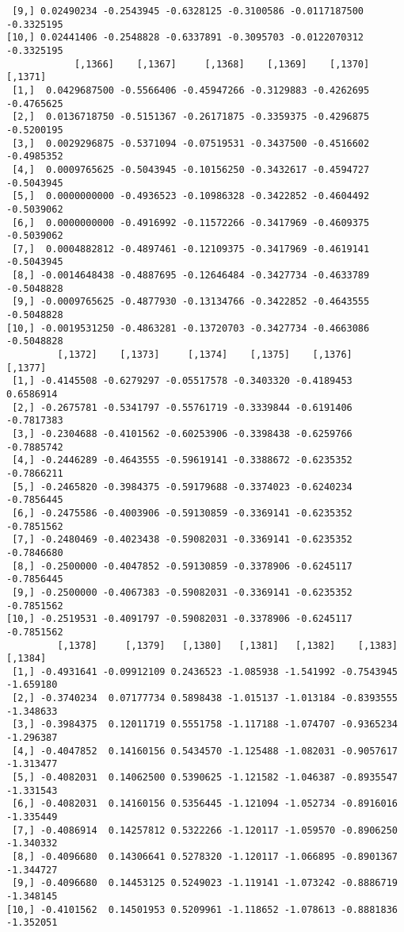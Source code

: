 \documentclass[
  letterpaper,
  DIV=11,
  numbers=noendperiod]{scrreprt}
\begin{document}
\begin{verbatim}
 [9,] 0.02490234 -0.2543945 -0.6328125 -0.3100586 -0.0117187500 -0.3325195
[10,] 0.02441406 -0.2548828 -0.6337891 -0.3095703 -0.0122070312 -0.3325195
            [,1366]    [,1367]     [,1368]    [,1369]    [,1370]    [,1371]
 [1,]  0.0429687500 -0.5566406 -0.45947266 -0.3129883 -0.4262695 -0.4765625
 [2,]  0.0136718750 -0.5151367 -0.26171875 -0.3359375 -0.4296875 -0.5200195
 [3,]  0.0029296875 -0.5371094 -0.07519531 -0.3437500 -0.4516602 -0.4985352
 [4,]  0.0009765625 -0.5043945 -0.10156250 -0.3432617 -0.4594727 -0.5043945
 [5,]  0.0000000000 -0.4936523 -0.10986328 -0.3422852 -0.4604492 -0.5039062
 [6,]  0.0000000000 -0.4916992 -0.11572266 -0.3417969 -0.4609375 -0.5039062
 [7,]  0.0004882812 -0.4897461 -0.12109375 -0.3417969 -0.4619141 -0.5043945
 [8,] -0.0014648438 -0.4887695 -0.12646484 -0.3427734 -0.4633789 -0.5048828
 [9,] -0.0009765625 -0.4877930 -0.13134766 -0.3422852 -0.4643555 -0.5048828
[10,] -0.0019531250 -0.4863281 -0.13720703 -0.3427734 -0.4663086 -0.5048828
         [,1372]    [,1373]     [,1374]    [,1375]    [,1376]    [,1377]
 [1,] -0.4145508 -0.6279297 -0.05517578 -0.3403320 -0.4189453  0.6586914
 [2,] -0.2675781 -0.5341797 -0.55761719 -0.3339844 -0.6191406 -0.7817383
 [3,] -0.2304688 -0.4101562 -0.60253906 -0.3398438 -0.6259766 -0.7885742
 [4,] -0.2446289 -0.4643555 -0.59619141 -0.3388672 -0.6235352 -0.7866211
 [5,] -0.2465820 -0.3984375 -0.59179688 -0.3374023 -0.6240234 -0.7856445
 [6,] -0.2475586 -0.4003906 -0.59130859 -0.3369141 -0.6235352 -0.7851562
 [7,] -0.2480469 -0.4023438 -0.59082031 -0.3369141 -0.6235352 -0.7846680
 [8,] -0.2500000 -0.4047852 -0.59130859 -0.3378906 -0.6245117 -0.7856445
 [9,] -0.2500000 -0.4067383 -0.59082031 -0.3369141 -0.6235352 -0.7851562
[10,] -0.2519531 -0.4091797 -0.59082031 -0.3378906 -0.6245117 -0.7851562
         [,1378]     [,1379]   [,1380]   [,1381]   [,1382]    [,1383]   [,1384]
 [1,] -0.4931641 -0.09912109 0.2436523 -1.085938 -1.541992 -0.7543945 -1.659180
 [2,] -0.3740234  0.07177734 0.5898438 -1.015137 -1.013184 -0.8393555 -1.348633
 [3,] -0.3984375  0.12011719 0.5551758 -1.117188 -1.074707 -0.9365234 -1.296387
 [4,] -0.4047852  0.14160156 0.5434570 -1.125488 -1.082031 -0.9057617 -1.313477
 [5,] -0.4082031  0.14062500 0.5390625 -1.121582 -1.046387 -0.8935547 -1.331543
 [6,] -0.4082031  0.14160156 0.5356445 -1.121094 -1.052734 -0.8916016 -1.335449
 [7,] -0.4086914  0.14257812 0.5322266 -1.120117 -1.059570 -0.8906250 -1.340332
 [8,] -0.4096680  0.14306641 0.5278320 -1.120117 -1.066895 -0.8901367 -1.344727
 [9,] -0.4096680  0.14453125 0.5249023 -1.119141 -1.073242 -0.8886719 -1.348145
[10,] -0.4101562  0.14501953 0.5209961 -1.118652 -1.078613 -0.8881836 -1.352051

\end{verbatim}
\end{document}
